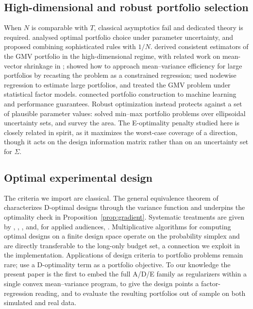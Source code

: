 \documentclass[11pt]{article}
\newcommand{\Sig}{\Sigma}
\begin{document}
\subsection{High-dimensional and robust portfolio selection}
When $N$ is comparable with $T$, classical asymptotics fail and dedicated theory
is required. \citet{kanzhou2007} analysed optimal portfolio choice under
parameter uncertainty, and \citet{tuzhou2011} proposed combining sophisticated
rules with $1/N$. \citet{bodnar2018} derived consistent estimators of the GMV
portfolio in the high-dimensional regime, with related work on mean-vector
shrinkage in \citet{bodnar2019}; \citet{ao2019} showed how to approach
mean--variance efficiency for large portfolios by recasting the problem as a
constrained regression; \citet{callot2021} used nodewise regression to estimate
large portfolios, and \citet{ding2021} treated the GMV problem under statistical
factor models. \citet{ban2018} connected portfolio construction to machine
learning and performance guarantees. Robust optimization instead protects against
a set of plausible parameter values: \citet{goldfarb2003} solved min--max
portfolio problems over ellipsoidal uncertainty sets, and \citet{fabozzi2007}
survey the area. The E-optimality penalty studied here is closely related in
spirit, as it maximizes the worst-case coverage of a direction, though it acts on
the design information matrix rather than on an uncertainty set for $\Sig$.

\subsection{Optimal experimental design}
The criteria we import are classical. The general equivalence theorem of
\citet{kiefer1960} characterizes D-optimal designs through the variance function
and underpins the optimality check in Proposition~\ref{prop:gradient}. Systematic
treatments are given by \citet{fed72}, \citet{silvey1980}, \citet{pukelsheim2006},
\citet{atk07} and, for applied audiences, \citet{bergerwong}. Multiplicative
algorithms for computing optimal designs on a finite design space
\citep{titterington1976,silvey1978,mandal2006} operate on the probability simplex
and are directly transferable to the long-only budget set, a connection we
exploit in the implementation. Applications of design criteria to portfolio
problems remain rare; \citet{depaula2022} use a D-optimality term as a portfolio
objective. To our knowledge the present paper is the first to embed the full
A/D/E family as regularizers within a single convex mean--variance program, to
give the design points a factor-regression reading, and to evaluate the
resulting portfolios out of sample on both simulated and real data.
\end{document}
